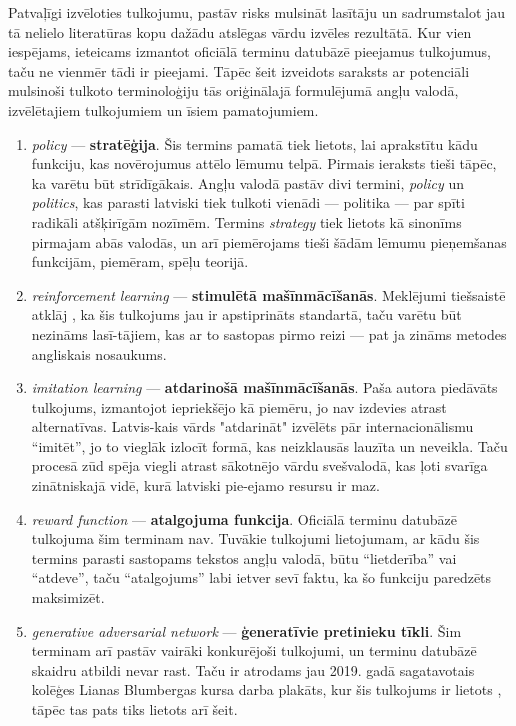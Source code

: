 \documentclass[12pt, a4paper]{article}
\numberwithin{equation}{section} %
\begin{document}
Patvaļīgi izvēloties tulkojumu, pastāv risks mulsināt lasītāju un sadrumstalot jau tā nelielo literatūras kopu dažādu atslēgas vārdu izvēles rezultātā. Kur vien iespējams, ieteicams izmantot oficiālā terminu datubāzē pieejamus tulkojumus, taču ne vienmēr tādi ir pieejami. Tāpēc šeit izveidots saraksts ar potenciāli mulsinoši tulkoto terminoloģiju tās oriģinālajā formulējumā angļu valodā, izvēlētajiem tulkojumiem un īsiem pamatojumiem.  

\begin{enumerate}
    \item \textit{policy} --- \textbf{stratēģija}. Šis termins pamatā tiek lietots, lai aprakstītu kādu funkciju, kas novērojumus attēlo lēmumu telpā. Pirmais ieraksts tieši tāpēc, ka varētu būt strīdīgākais. Angļu valodā pastāv divi termini, \textit{policy} un \textit{politics}, kas parasti latviski tiek tulkoti vienādi --- politika --- par spīti radikāli atšķirīgām nozīmēm. Termins \textit{strategy} tiek lietots kā sinonīms pirmajam abās valodās, un arī piemērojams tieši šādām lēmumu pieņemšanas funkcijām, piemēram, spēļu teorijā.
    \item \textit{reinforcement learning} --- \textbf{stimulētā mašīnmācīšanās}. Meklējumi tiešsaistē atklāj \cite{enc_stim}, ka šis tulkojums jau ir apstiprināts standartā, taču varētu būt nezināms lasī-tājiem, kas ar to sastopas pirmo reizi --- pat ja zināms metodes angliskais nosaukums.
    \item \textit{imitation learning} --- \textbf{atdarinošā mašīnmācīšanās}. Paša autora piedāvāts tulkojums, izmantojot iepriekšējo kā piemēru, jo nav izdevies atrast alternatīvas. Latvis-kais vārds "atdarināt" izvēlēts pār internacionālismu ``imitēt'', jo to vieglāk izlocīt formā, kas neizklausās lauzīta un neveikla. Taču procesā zūd spēja viegli atrast sākotnējo vārdu svešvalodā, kas ļoti svarīga zinātniskajā vidē, kurā latviski pie-ejamo resursu ir maz.
    \item \textit{reward function} --- \textbf{atalgojuma funkcija}. Oficiālā terminu datubāzē tulkojuma šim terminam nav. Tuvākie tulkojumi lietojumam, ar kādu šis termins parasti sastopams tekstos angļu valodā, būtu ``lietderība'' vai ``atdeve'', taču ``atalgojums'' labi ietver sevī faktu, ka šo funkciju paredzēts maksimizēt.
    \item \textit{generative adversarial network} --- \textbf{ģeneratīvie pretinieku tīkli}. Šim terminam arī pastāv vairāki konkurējoši tulkojumi, un terminu datubāzē skaidru atbildi nevar rast. Taču ir atrodams jau 2019. gadā sagatavotais kolēģes Lianas Blumbergas kursa darba plakāts, kur šis tulkojums ir lietots \cite{GAN}, tāpēc tas pats tiks lietots arī šeit.
\end{enumerate}
\end{document}
